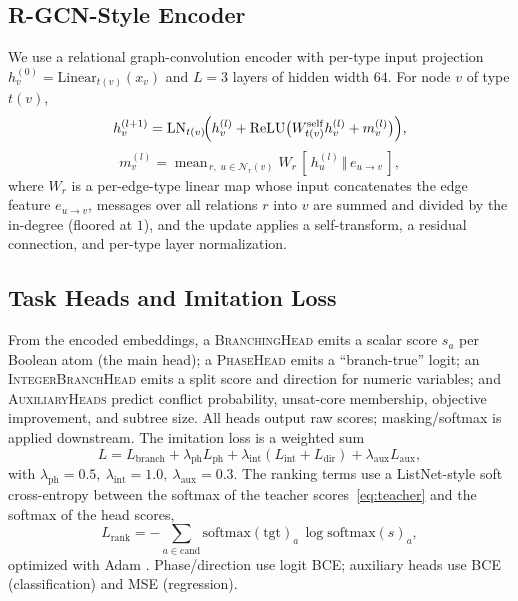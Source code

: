 \documentclass[letterpaper]{article} %
\theoremstyle{definition}
\theoremstyle{plain}
\theoremstyle{remark}
\DeclareMathOperator*{\meanop}{mean}
\begin{document}
\subsection{R-GCN-Style Encoder}
\label{sec:gnn}

We use a relational graph-convolution encoder \citep{schlichtkrull2018rgcn}
with per-type input projection $h_v^{(0)}=\mathrm{Linear}_{t(v)}(x_v)$ and
$L=3$ layers of hidden width $64$. For node $v$ of type $t(v)$,
\begin{equation}
h_v^{(l+1)}=\mathrm{LN}_{t(v)}\!\Bigl(h_v^{(l)}+\mathrm{ReLU}\bigl(
W^{\mathrm{self}}_{t(v)} h_v^{(l)}
+ m_v^{(l)}\bigr)\Bigr),
\label{eq:rgcn}
\end{equation}
\begin{equation}
m_v^{(l)}=\meanop_{\,r,\;u\in\mathcal{N}_r(v)}
W_r\,[\,h_u^{(l)}\,\Vert\,e_{u\to v}\,],
\label{eq:msg}
\end{equation}
where $W_r$ is a per-edge-type linear map whose input concatenates the edge
feature $e_{u\to v}$, messages over all relations $r$ into $v$ are summed and
divided by the in-degree (floored at $1$), and the update applies a
self-transform, a residual connection, and per-type layer normalization.

\subsection{Task Heads and Imitation Loss}
\label{sec:heads}

From the encoded embeddings, a \textsc{BranchingHead} emits a scalar score
$s_a$ per Boolean atom (the main head); a \textsc{PhaseHead} emits a
``branch-true'' logit; an \textsc{IntegerBranchHead} emits a split score and
direction for numeric variables; and \textsc{AuxiliaryHeads} predict
conflict probability, unsat-core membership, objective improvement, and
subtree size. All heads output raw scores; masking/softmax is applied
downstream. The imitation loss is a weighted sum
\begin{equation}
L=L_{\mathrm{branch}}+\lambda_{\mathrm{ph}}L_{\mathrm{ph}}
+\lambda_{\mathrm{int}}(L_{\mathrm{int}}+L_{\mathrm{dir}})
+\lambda_{\mathrm{aux}}L_{\mathrm{aux}},
\label{eq:imit}
\end{equation}
with $\lambda_{\mathrm{ph}}=0.5,\ \lambda_{\mathrm{int}}=1.0,\
\lambda_{\mathrm{aux}}=0.3$. The ranking terms use a ListNet-style
\citep{cao2007listnet} soft cross-entropy between the softmax of the teacher
scores~\eqref{eq:teacher} and the softmax of the head scores,
\begin{equation}
L_{\mathrm{rank}}=-\!\!\sum_{a\in\text{cand}}\!\mathrm{softmax}(\text{tgt})_a\,
\log\mathrm{softmax}(s)_a,
\label{eq:listnet}
\end{equation}
optimized with Adam \citep{kingma2015adam}. Phase/direction use logit BCE;
auxiliary heads use BCE (classification) and MSE (regression).
\end{document}
